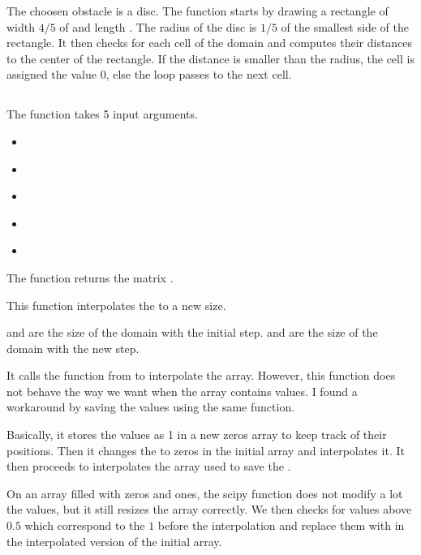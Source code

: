 The choosen obstacle is a disc. The function starts by drawing a rectangle of
width $4/5$ of  and length . The radius of the disc is $1/5$ of
the smallest side of the rectangle. It then checks for each cell of the domain
and computes their distances to the center of the rectangle. If the distance is
smaller than the radius, the cell is assigned the value 0, else the loop passes
to the next cell.

\subsection{}
\subsubsection{}
The function \textcolor{func}{} takes 5 input arguments.
\begin{itemize}
      \item {} \textcolor{dtype}{}
      \item {} \textcolor{dtype}{}
      \item {} \textcolor{dtype}{}
      \item {} \textcolor{dtype}{}
      \item {} \textcolor{dtype}{}
\end{itemize}
The function returns the matrix .

This function interpolates the  to a new size.

 and  are  the size of the domain with the initial
step.  and  are  the size of the domain with
the new step.

It calls the function  from  to interpolate
the array. However, this function does not behave the way we want when the
array contains  values. I found a workaround\cite{interp} by saving
the  values using the same function.

Basically, it stores the  values as 1 in a new zeros array to keep
track of their positions. Then it changes the  to zeros in the
initial array and interpolates it. It then proceeds to interpolates the array
used to save the .

On an array filled with zeros and ones, the scipy function does not modify a
lot the values, but it still resizes the array correctly. We then checks for
values above $0.5$ which correspond to the $1$ before the interpolation and
replace them with  in the interpolated version of the initial array.


